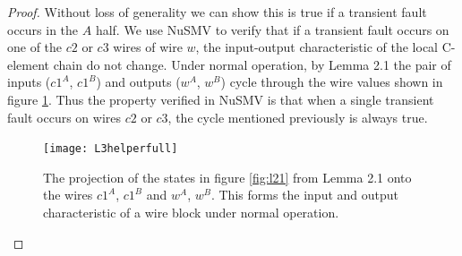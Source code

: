 \documentclass[12pt]{report}
\begin{document}
\begin{proof}
Without loss of generality we can show this is true if a transient fault occurs in the $A$ half.  We use NuSMV to verify that if a transient fault occurs on one of the $c2$ or $c3$ wires of wire $w$, the input-output characteristic of the local C-element chain do not change.  Under normal operation, by Lemma 2.1 the pair of inputs ($c1^A$, $c1^B$) and outputs ($w^A$, $w^B$) cycle through the wire values shown in figure \ref{fig:l3helper}.  Thus the property verified in NuSMV is that when a single transient fault occurs on wires $c2$ or $c3$, the cycle mentioned previously is always true.    
\begin{figure}
  \centering
    \texttt{[image: L3helperfull]}
  \caption{The projection of the states in figure \ref{fig:l21} from Lemma 2.1 onto the wires $c1^A$, $c1^B$ and $w^A$, $w^B$.  This forms the input and output characteristic of a wire block under normal operation.}
  \label{fig:l3helper}
\end{figure}


\end{proof}
\end{document}
